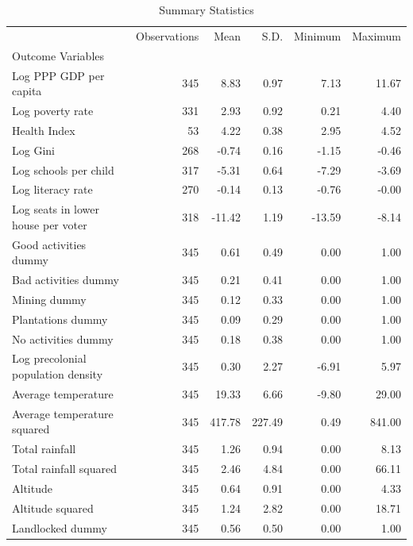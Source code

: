 \begin{table}
\caption{Summary Statistics}
\label{tab:summary_stats}
\begin{tabular}{lrrrrr}
\toprule
 & Observations & Mean & S.D. & Minimum & Maximum \\
Outcome Variables &  &  &  &  &  \\
\midrule
Log PPP GDP per capita & 345 & 8.83 & 0.97 & 7.13 & 11.67 \\
Log poverty rate & 331 & 2.93 & 0.92 & 0.21 & 4.40 \\
Health Index & 53 & 4.22 & 0.38 & 2.95 & 4.52 \\
Log Gini & 268 & -0.74 & 0.16 & -1.15 & -0.46 \\
Log schools per child & 317 & -5.31 & 0.64 & -7.29 & -3.69 \\
Log literacy rate & 270 & -0.14 & 0.13 & -0.76 & -0.00 \\
Log seats in lower house per voter & 318 & -11.42 & 1.19 & -13.59 & -8.14 \\
Good activities dummy & 345 & 0.61 & 0.49 & 0.00 & 1.00 \\
Bad activities dummy & 345 & 0.21 & 0.41 & 0.00 & 1.00 \\
Mining dummy & 345 & 0.12 & 0.33 & 0.00 & 1.00 \\
Plantations dummy & 345 & 0.09 & 0.29 & 0.00 & 1.00 \\
No activities dummy & 345 & 0.18 & 0.38 & 0.00 & 1.00 \\
Log precolonial population density & 345 & 0.30 & 2.27 & -6.91 & 5.97 \\
Average temperature & 345 & 19.33 & 6.66 & -9.80 & 29.00 \\
Average temperature squared & 345 & 417.78 & 227.49 & 0.49 & 841.00 \\
Total rainfall & 345 & 1.26 & 0.94 & 0.00 & 8.13 \\
Total rainfall squared & 345 & 2.46 & 4.84 & 0.00 & 66.11 \\
Altitude & 345 & 0.64 & 0.91 & 0.00 & 4.33 \\
Altitude squared & 345 & 1.24 & 2.82 & 0.00 & 18.71 \\
Landlocked dummy & 345 & 0.56 & 0.50 & 0.00 & 1.00 \\
\bottomrule
\end{tabular}
\end{table}
